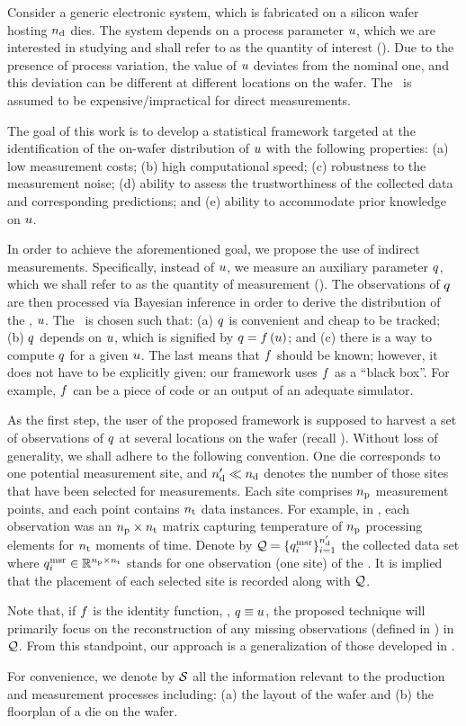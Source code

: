 Consider a generic electronic system, which is fabricated on a silicon wafer hosting ${n_\text{d}}$ dies.
The system depends on a process parameter $u$, which we are interested in studying and shall refer to as the quantity of interest (\qoi).
Due to the presence of process variation, the value of $u$ deviates from the nominal one, and this deviation can be different at different locations on the wafer.
The \qoi\ is assumed to be expensive/impractical for direct measurements.

The goal of this work is to develop a statistical framework targeted at the identification of the on-wafer distribution of $u$ with the following properties: (a) low measurement costs; (b) high computational speed; (c) robustness to the measurement noise; (d) ability to assess the trustworthiness of the collected data and corresponding predictions; and (e) ability to accommodate prior knowledge on $u$.

In order to achieve the aforementioned goal, we propose the use of indirect measurements.
Specifically, instead of $u$, we measure an auxiliary parameter $q$, which we shall refer to as the quantity of measurement (\qom).
The observations of $q$ are then processed via Bayesian inference in order to derive the distribution of the \qoi, $u$.
The \qom\ is chosen such that: (a) $q$ is convenient and cheap to be tracked; (b) $q$ depends on $u$, which is signified by $\q = \oBB{\u}$; and (c) there is a way to compute $q$ for a given $u$.
The last means that $\oBB$ should be known; however, it does not have to be explicitly given: our framework uses $\oBB$ as a ``black box''.
For example, $\oBB$ can be a piece of code or an output of an adequate simulator.

As the first step, the user of the proposed framework is supposed to harvest a set of observations of $q$ at several locations on the wafer (recall ).
Without loss of generality, we shall adhere to the following convention.
One die corresponds to one potential measurement site, and ${n_\text{d}'} \ll {n_\text{d}}$ denotes the number of those sites that have been selected for measurements.
Each site comprises ${n_\text{p}}$ measurement points, and each point contains ${n_\text{t}}$ data instances.
For example, in , each observation was an ${n_\text{p}} \times {n_\text{t}}$ matrix capturing temperature of ${n_\text{p}}$ processing elements for ${n_\text{t}}$ moments of time.
Denote by $\mathcal{Q} = \{ q_i^{\text{msr}} \}_{i = 1}^{n_\text{d}'}$ the collected data set where $q_i^{\text{msr}} \in \mathbb{R}^{{n_\text{p}} \times {n_\text{t}}}$ stands for one observation (one site) of the \qom.
It is implied that the placement of each selected site is recorded along with $\mathcal{Q}$.

Note that, if $\oBB$ is the identity function, \ie, $q \equiv u$, the proposed technique will primarily focus on the reconstruction of any missing observations (defined in ) in $\mathcal{Q}$.
From this standpoint, our approach is a generalization of those developed in \cite{zhang2010, reda2009}.

For convenience, we denote by $\mathcal{S}$ all the information relevant to the production and measurement processes including: (a) the layout of the wafer and (b) the floorplan of a die on the wafer.
